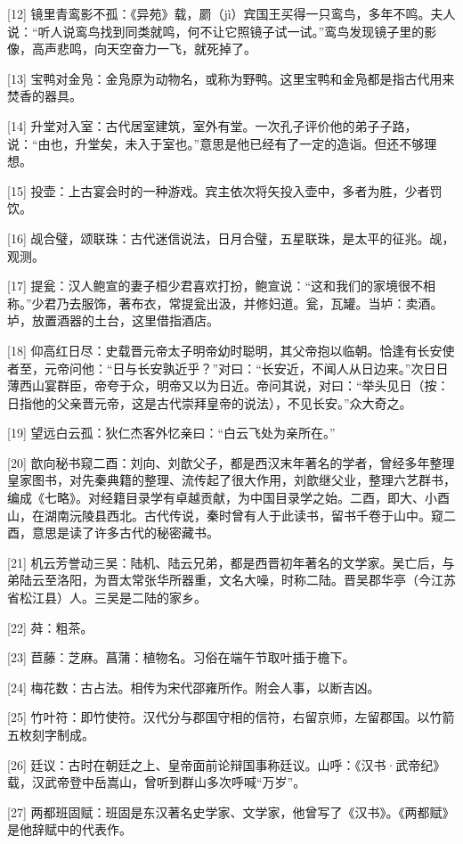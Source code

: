 \documentclass[12pt,UTF8]{ctexbook}
\begin{document}
[12] 镜里青鸾影不孤：《异苑》载，罽（jì）宾国王买得一只鸾鸟，多年不鸣。夫人说：“听人说鸾鸟找到同类就鸣，何不让它照镜子试一试。”鸾鸟发现镜子里的影像，高声悲鸣，向天空奋力一飞，就死掉了。

[13] 宝鸭对金凫：金凫原为动物名，或称为野鸭。这里宝鸭和金凫都是指古代用来焚香的器具。

[14] 升堂对入室：古代居室建筑，室外有堂。一次孔子评价他的弟子子路，说：“由也，升堂矣，未入于室也。”意思是他已经有了一定的造诣。但还不够理想。

[15] 投壶：上古宴会时的一种游戏。宾主依次将矢投入壶中，多者为胜，少者罚饮。

[16] 觇合璧，颂联珠：古代迷信说法，日月合璧，五星联珠，是太平的征兆。觇，观测。

[17] 提瓮：汉人鲍宣的妻子桓少君喜欢打扮，鲍宣说：“这和我们的家境很不相称。”少君乃去服饰，著布衣，常提瓮出汲，并修妇道。瓮，瓦罐。当垆：卖酒。垆，放置酒器的土台，这里借指酒店。

[18] 仰高红日尽：史载晋元帝太子明帝幼时聪明，其父帝抱以临朝。恰逢有长安使者至，元帝问他：“日与长安孰近乎？”对曰：“长安近，不闻人从日边来。”次日日薄西山宴群臣，帝夸于众，明帝又以为日近。帝问其说，对曰：“举头见日（按：日指他的父亲晋元帝，这是古代崇拜皇帝的说法），不见长安。”众大奇之。

[19] 望远白云孤：狄仁杰客外忆亲曰：“白云飞处为亲所在。”

[20] 歆向秘书窥二酉：刘向、刘歆父子，都是西汉末年著名的学者，曾经多年整理皇家图书，对先秦典籍的整理、流传起了很大作用，刘歆继父业，整理六艺群书，编成《七略》。对经籍目录学有卓越贡献，为中国目录学之始。二酉，即大、小酉山，在湖南沅陵县西北。古代传说，秦时曾有人于此读书，留书千卷于山中。窥二酉，意思是读了许多古代的秘密藏书。

[21] 机云芳誉动三吴：陆机、陆云兄弟，都是西晋初年著名的文学家。吴亡后，与弟陆云至洛阳，为晋太常张华所器重，文名大噪，时称二陆。晋吴郡华亭（今江苏省松江县）人。三吴是二陆的家乡。

[22] 荈：粗茶。

[23] 苣藤：芝麻。菖蒲：植物名。习俗在端午节取叶插于檐下。

[24] 梅花数：古占法。相传为宋代邵雍所作。附会人事，以断吉凶。

[25] 竹叶符：即竹使符。汉代分与郡国守相的信符，右留京师，左留郡国。以竹箭五枚刻字制成。

[26] 廷议：古时在朝廷之上、皇帝面前论辩国事称廷议。山呼：《汉书·武帝纪》载，汉武帝登中岳嵩山，曾听到群山多次呼喊“万岁”。

[27] 两都班固赋：班固是东汉著名史学家、文学家，他曾写了《汉书》。《两都赋》是他辞赋中的代表作。
\end{document}
